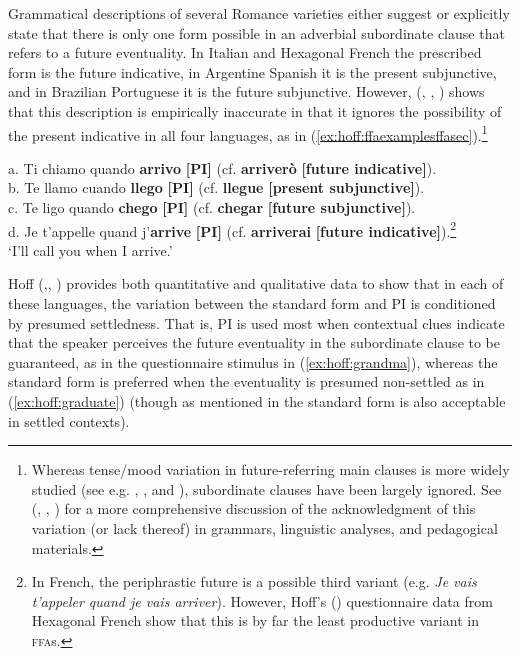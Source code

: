 \documentclass[output=paper,colorlinks,citecolor=brown]{langscibook}
\begin{document}
Grammatical descriptions of several Romance varieties either suggest or explicitly state that there is only one form possible in an adverbial subordinate clause that refers to a future eventuality. In Italian and Hexagonal French the prescribed form is the future indicative, in Argentine Spanish it is the present subjunctive, and in Brazilian Portuguese it is the future subjunctive. However, \citeauthor{Hoff2019} (\citeyear{Hoff2019}, \citeyear{Hoff2020}, \citeyear{HoffForthcoming}) shows that this description is empirically inaccurate in that it ignores the possibility of the present indicative in all four languages, as in (\ref{ex:hoff:ffaexamplesffasec}).\footnote{Whereas tense/mood variation in future-referring main clauses is more widely studied (see e.g. \citealt{Grimm2015}, \citealt{GudmestadEdmondsDonaldsonCarmichael2018}, and \citealt{PoplackTurpin1999}), subordinate clauses have been largely ignored. See \citeauthor{Hoff2019} (\citeyear{Hoff2019}, \citeyear{Hoff2020}, \citeyear{HoffForthcoming}) for a more comprehensive discussion of the acknowledgment of this variation (or lack thereof) in grammars, linguistic analyses, and pedagogical materials.}

\begin{exe}
\ex\label{ex:hoff:ffaexamplesffasec}
a.         Ti chiamo quando \textbf{arrivo} \textbf{[PI]} (cf. \textbf{arriverò} \textbf{[future indicative]}). \\
b.         Te llamo cuando \textbf{llego} \textbf{[PI]} (cf. \textbf{llegue} \textbf{[present subjunctive]}). \\
c.         Te ligo quando \textbf{chego} \textbf{[PI]} (cf. \textbf{chegar} \textbf{[future subjunctive]}). \\
d.         Je t’appelle quand j’\textbf{arrive} \textbf{[PI]} (cf. \textbf{arriverai} \textbf{[future indicative]}).\footnote{In French, the periphrastic future is a possible third variant (e.g. \textit{Je vais t’appeler quand je vais arriver}). However, Hoff’s (\citeyear{HoffForthcoming}) questionnaire data from Hexagonal French show that this is by far the least productive variant in \textsc{ffa}s.} \\
`I’ll call you when I arrive.'
\end{exe}
                        
Hoff (\citeyear{Hoff2019},\citeyear{Hoff2020}, \citeyear{HoffForthcoming}) provides both quantitative and qualitative data to show that in each of these languages, the variation between the standard form and PI is conditioned by presumed settledness. That is, PI is used most when contextual clues indicate that the speaker perceives the future eventuality in the subordinate clause to be guaranteed, as in the questionnaire stimulus in (\ref{ex:hoff:grandma}), whereas the standard form is preferred when the eventuality is presumed non-settled as in (\ref{ex:hoff:graduate}) (though as mentioned in  the standard form is also acceptable in settled contexts).
\end{document}
